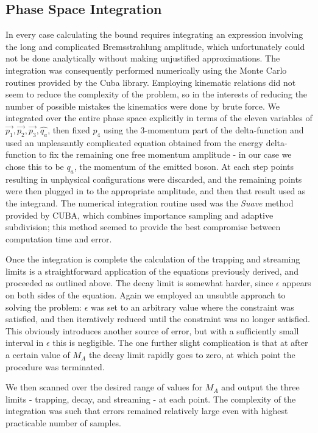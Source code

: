 \documentclass[nofootinbib,prd,superscriptaddress,twocolumn]{revtex4}
\begin{document}
	
	
\subsection{Phase Space Integration}
In every case calculating the bound requires integrating an expression involving the long and complicated Bremsstrahlung amplitude, which unfortunately could not be done analytically without making unjustified approximations. The integration was consequently performed numerically using the Monte Carlo routines provided by the Cuba library. Employing kinematic relations did not seem to reduce the complexity of the problem, so in the interests of reducing the number of possible mistakes the kinematics were done by brute force. We integrated over the entire phase space explicitly in terms of the eleven variables of $ \vec{p_1}, \vec{p_2}, \vec{p_3}, \hat{q_a} $, then fixed $ p_4 $ using the 3-momentum part of the delta-function and used an unpleasantly complicated equation obtained from the energy delta-function to fix the remaining one free momentum amplitude - in our case we chose this to be $ q_a $, the momentum of the emitted boson. At each step points resulting in unphysical configurations were discarded, and the remaining points were then plugged in to the appropriate amplitude, and then that result used as the integrand. The numerical integration routine used was the \textit{Suave} method provided by CUBA, which combines importance sampling and adaptive subdivision; this method seemed to provide the best compromise between computation time and error. 
	
Once the integration is complete the calculation of the trapping and streaming limits is a straightforward application of the equations previously derived, and proceeded as outlined above. The decay limit is somewhat harder, since $ \epsilon $ appears on both sides of the equation. Again we employed an unsubtle approach to solving the problem: $ \epsilon $ was set to an arbitrary value where the constraint was satisfied, and then iteratively reduced until the constraint was no longer satisfied. This obviously introduces another source of error, but with a sufficiently small interval in $ \epsilon $ this is negligible. The one further slight complication is that at after a certain value of $ M_A $ the decay limit rapidly goes to zero, at which point the procedure was terminated.
	
We then scanned over the desired range of values for $ M_A $ and output the three limits - trapping, decay, and streaming - at each point. The complexity of the integration was such that errors remained relatively large even with highest practicable number of samples.
\end{document}
